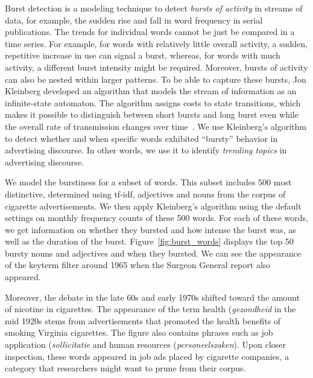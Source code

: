 \documentclass[USenglish]{article}
\begin{document}
Burst detection is a modeling technique to detect \textit{bursts of activity} in streams of data, for example, the sudden rise and fall in word frequency in serial publications. The trends for individual words cannot be just be compared in a time series. For example, for words with relatively little overall activity, a sudden, repetitive increase in use can signal a burst, whereas, for words with much activity, a different burst intensity might be required. Moreover, bursts of activity can also be nested within larger patterns. To be able to capture these bursts, Jon Kleinberg developed an algorithm that models the stream of information as an infinite-state automaton. The algorithm assigns costs to state transitions, which makes it possible to distinguish between short bursts and long burst even while the overall rate of transmission changes over time~\cite{kleinberg_bursty_2002}. We use Kleinberg's algorithm to detect whether and when specific words exhibited ``bursty'' behavior in advertising discourse. In other words, we use it to identify \textit{trending topics} in advertising discourse. 

We model the burstiness for a subset of words. This subset includes 500 most distinctive, determined using tf-idf, adjectives and nouns from the corpus of cigarette advertisements. We then apply Kleinberg's algorithm using the default settings on monthly frequency counts of these 500 words. For each of these words, we get information on whether they bursted and how intense the burst was, as well as the duration of the burst. Figure~\ref{fig:burst_words} displays the top 50 bursty nouns and adjectives and when they bursted. We can  see the appearance of the keyterm filter around 1965 when the Surgeon General report also appeared. 

Moreover, the debate in the late 60s and early 1970s shifted toward the amount of nicotine in cigarettes. The appearance of the term health (\textit{gezondheid} in the mid 1920s stems from advertisements that promoted the health benefits of smoking Virginia cigarettes. The figure also contains phrases such as job application (\textit{sollicitatie} and human resources (\textit{personeelszaken}). Upon closer inspection, these words appeared in job ads placed by cigarette companies, a category that researchers might want to prune from their corpus.
\end{document}
